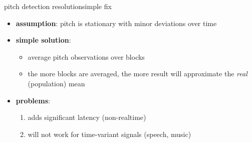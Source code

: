         \begin{frame}{pitch detection resolution}{simple fix}
            \begin{itemize}
                \item   \textbf{assumption}: pitch is stationary with minor deviations over time
                \item<2-> \textbf{simple solution}: 
                    \begin{itemize}
                        \item   average pitch observations over blocks
                        \item   the more blocks are averaged, the more result will approximate the \textit{real} (population) mean
                    \end{itemize}
                \item<3->   \textbf{problems}:
                    \begin{enumerate}
                        \item   adds significant latency (non-realtime)
                        \item   will not work for time-variant signals (speech, music)
                    \end{enumerate}
            \end{itemize}
        \end{frame}
    
